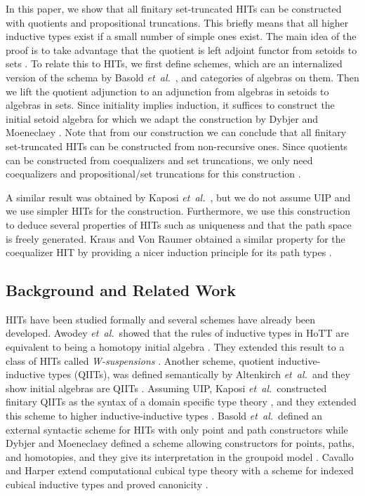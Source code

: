 \documentclass[9pt]{entcs}
\newcommand{\etal}{\emph{et~al.}}
\newcommand{\0}{\textbf{0}} %
\begin{document}
In this paper, we show that all finitary set-truncated HITs can be constructed with quotients and propositional truncations. 
This briefly means that all higher inductive types exist if a small number of simple ones exist.
The main idea of the proof is to take advantage that the quotient is left adjoint functor from setoids to sets \cite{RijkeS15}.
To relate this to HITs, we first define schemes, which are an internalized version of the schema by Basold \etal \ \cite{BasoldGW17}, and categories of algebras on them.
Then we lift the quotient adjunction to an adjunction from algebras in setoids to algebras in sets.
Since initiality implies induction, it suffices to construct the initial setoid algebra for which we adapt the construction by Dybjer and Moeneclaey \cite{DybjerM18,moeneclaey2016schema}.
Note that from our construction we can conclude that all finitary set-truncated HITs can be constructed from non-recursive ones.
Since quotients can be constructed from coequalizers and set truncations, we only need coequalizers and propositional/set truncations for this construction \cite{rijke2017join}.

A similar result was obtained by Kaposi \etal \ \cite{KaposiKA19}, but we do not assume UIP and we use simpler HITs for the construction.
Furthermore, we use this construction to deduce several properties of HITs such as uniqueness and that the path space is freely generated.
Kraus and Von Raumer obtained a similar property for the coequalizer HIT by providing a nicer induction principle for its path types \cite{KrausRaumer}.

\subsection{Background and Related Work}
HITs have been studied formally and several schemes have already been developed.
Awodey \etal \ showed that the rules of inductive types \cite{dybjer1994inductive} in HoTT are equivalent to being a homotopy initial algebra \cite{AwodeyGS12}.
They extended this result to a class of HITs called \emph{W-suspensions} \cite{Sojakova15}.
Another scheme, quotient inductive-inductive types (QIITs), was defined semantically by Altenkirch \etal \ and they show initial algebras are QIITs \cite{AltenkirchCDKF18}.
Assuming UIP, Kaposi \etal \ constructed finitary QIITs as the syntax of a domain specific type theory \cite{KaposiKA19}, and they extended this scheme to higher inductive-inductive types \cite{KaposiK18}.
Basold \etal \ defined an external syntactic scheme for HITs with only point and path constructors \cite{BasoldGW17}
while Dybjer and Moeneclaey defined a scheme allowing constructors for points, paths, and homotopies, and they give its interpretation in the groupoid model  \cite{DybjerM18,HofmannS94}.
Cavallo and Harper extend computational cubical type theory with a scheme for indexed cubical inductive types and proved canonicity \cite{AngiuliHW17,CavalloH19}.
\end{document}
